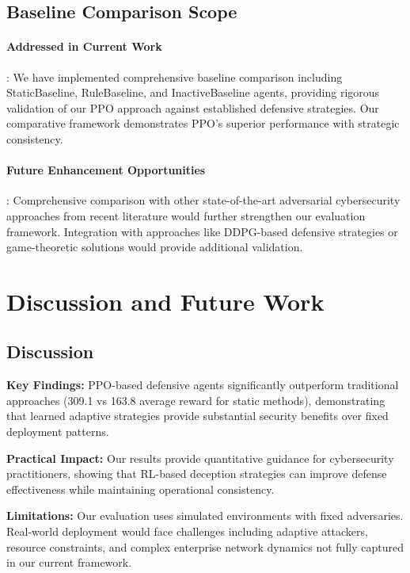 \documentclass[12pt,oneside]{article}
\begin{document}
\subsection{Baseline Comparison Scope}

\paragraph{Addressed in Current Work}: We have implemented comprehensive baseline comparison including StaticBaseline, RuleBaseline, and InactiveBaseline agents, providing rigorous validation of our PPO approach against established defensive strategies. Our comparative framework demonstrates PPO's superior performance with strategic consistency.

\paragraph{Future Enhancement Opportunities}: Comprehensive comparison with other state-of-the-art adversarial cybersecurity approaches from recent literature would further strengthen our evaluation framework. Integration with approaches like DDPG-based defensive strategies or game-theoretic solutions would provide additional validation.



\clearpage
\section{Discussion and Future Work}

\subsection{Discussion}

\textbf{Key Findings:} PPO-based defensive agents significantly outperform traditional approaches (309.1 vs 163.8 average reward for static methods), demonstrating that learned adaptive strategies provide substantial security benefits over fixed deployment patterns.

\textbf{Practical Impact:} Our results provide quantitative guidance for cybersecurity practitioners, showing that RL-based deception strategies can improve defense effectiveness while maintaining operational consistency.

\textbf{Limitations:} Our evaluation uses simulated environments with fixed adversaries. Real-world deployment would face challenges including adaptive attackers, resource constraints, and complex enterprise network dynamics not fully captured in our current framework.
\end{document}
